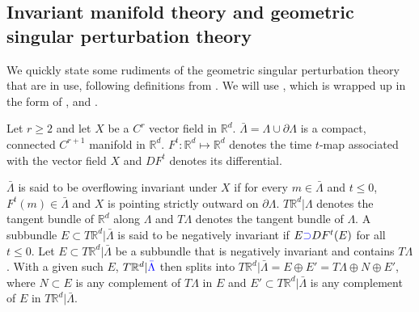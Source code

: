 \documentclass[a4paper,11pt]{article}
\def\blue{\color{blue}}
\theoremstyle{remark}
\begin{document}
\subsection{Invariant manifold theory and geometric singular perturbation theory}\label{sec:singpert}
We quickly state some rudiments of the geometric singular perturbation theory that are in use, following definitions from \cite{fenichel_asymptotic_1977,fenichel_geometric_1979}. %
We will use \cite[Theorem 12.2]{fenichel_geometric_1979}, which is wrapped up in the form of \cite[Theorem 2.2]{Sz1991}, and \cite[Theorem 3.1]{Sz1991}.

{\blue Let $r\ge2$ and} let $X$ be a $C^{r}$ vector field in $\mathbb{R}^d$. $\bar{\Lambda}=\Lambda \cup \partial \Lambda$ is a compact, connected $C^{r+1}$ manifold in $\mathbb{R}^d$. $F^t: \mathbb{R}^d \mapsto \mathbb{R}^d$ denotes the time $t$-map associated with the vector field $X$ and $DF^t$ denotes its differential. 

$\bar{\Lambda}$ is said to be overflowing invariant under $X$ if for every $m\in\bar{\Lambda}$ and $t\le0$, $F^t(m)\in \bar{\Lambda}$ and $X$ is pointing strictly outward on $\partial \Lambda$. $T \mathbb{R}^d|\Lambda$ denotes the tangent bundle of $\mathbb{R}^d$ along $\Lambda$ and $T\Lambda$ denotes the tangent bundle of $\Lambda$. A subbundle $E\subset T\mathbb{R}^d|\bar{\Lambda}$ is said to be negatively invariant if $E{\blue \supset} DF^t(E)$ for all $t\le0$. Let $E\subset T\mathbb{R}^d|\bar{\Lambda}$ be a subbundle that is negatively invariant and {\blue contains} $T\Lambda$. With a given such $E$,  $T \mathbb{R}^d|{\blue \bar\Lambda}$ then splits into $T\mathbb{R}^d|\bar{\Lambda} =E\oplus E'= T\Lambda\oplus N\oplus E'$, where $N\subset E$ is any complement of $T\Lambda$ in $E$ and $E'\subset T\mathbb{R}^d|\bar{\Lambda}$ is any complement of $E$ in $T\mathbb{R}^d|\bar{\Lambda}$.  
\end{document}
